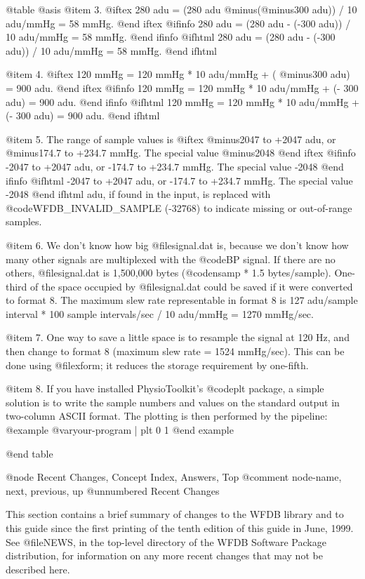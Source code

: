 {{{{{{{{@table @asis
@item 3.
@iftex
280 adu = (280 adu @minus{}(@minus{}300 adu)) / 10 adu/mmHg = 58 mmHg.
@end iftex
@ifinfo
280 adu = (280 adu - (-300 adu)) / 10 adu/mmHg = 58 mmHg.
@end ifinfo
@ifhtml
280 adu = (280 adu - (-300 adu)) / 10 adu/mmHg = 58 mmHg.
@end ifhtml

@item 4.
@iftex
120 mmHg = 120 mmHg * 10 adu/mmHg + ( @minus{}300 adu) = 900 adu.
@end iftex
@ifinfo
120 mmHg = 120 mmHg * 10 adu/mmHg + (- 300 adu) = 900 adu.
@end ifinfo
@ifhtml
120 mmHg = 120 mmHg * 10 adu/mmHg + (- 300 adu) = 900 adu.
@end ifhtml

@item 5.
The range of sample values is
@iftex
@minus{}2047 to +2047 adu, or @minus{}174.7 to +234.7 mmHg.  The
special value @minus{}2048
@end iftex
@ifinfo
-2047 to +2047 adu, or -174.7 to +234.7 mmHg.  The special value -2048
@end ifinfo
@ifhtml
-2047 to +2047 adu, or -174.7 to +234.7 mmHg.  The special value -2048
@end ifhtml
adu, if found in the input, is replaced with @code{WFDB_INVALID_SAMPLE}
(-32768) to indicate missing or out-of-range samples.

@item 6.
We don't know how big @file{signal.dat} is, because we don't know how
many other signals are multiplexed with the @code{BP} signal.  If there
are no others, @file{signal.dat} is 1,500,000 bytes (@code{nsamp} * 1.5
bytes/sample).  One-third of the space occupied by @file{signal.dat} could be
saved if it were converted to format 8.  The maximum slew rate
representable in format 8 is 127 adu/sample interval * 100 sample
intervals/sec / 10 adu/mmHg = 1270 mmHg/sec.

@item 7.
One way to save a little space is to resample the signal at 120 Hz, and
then change to format 8 (maximum slew rate = 1524 mmHg/sec).  This can be
done using @file{xform};  it reduces the storage requirement by
one-fifth.

@item 8.
If you have installed PhysioToolkit's @code{plt} package, a simple
solution is to write the sample numbers and values on the standard
output in two-column ASCII format.  The plotting is then performed by
the pipeline:
@example
@var{your-program} | plt 0 1
@end example

@end table

@node     Recent Changes, Concept Index, Answers, Top
@comment  node-name,  next,  previous,  up
@unnumbered Recent Changes

This section contains a brief summary of changes to the WFDB library and
to this guide since the first printing of the tenth edition of this
guide in June, 1999.  See @file{NEWS}, in the top-level directory of the
WFDB Software Package distribution, for information on any more recent
changes that may not be described here.

}}}}}}}}
